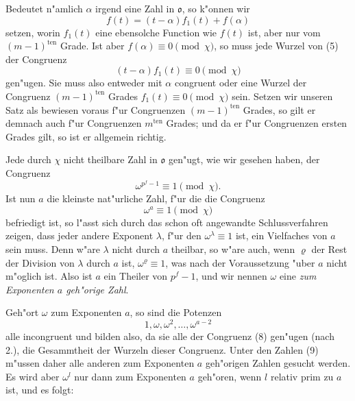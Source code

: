 \documentclass[12pt,a4paper]{article}
\theoremstyle{definition}
\begin{document}
Bedeutet n"amlich $\alpha$ irgend eine Zahl in $\mathfrak{o}$, so k"onnen wir
\begin{equation}
f(t) = (t - \alpha)f_1(t) + f(\alpha)
\end{equation}
setzen, worin $f_1(t)$ eine ebensolche Function wie $f(t)$ ist, aber nur vom $(m-1)^{\text{ten}}$ Grade. Ist aber $f(\alpha) \equiv 0 \pmod{\chi}$, so muss jede Wurzel von (5) der Congruenz
\begin{equation}
(t - \alpha)f_1(t) \equiv 0 \pmod{\chi}
\end{equation}
gen"ugen. Sie muss also entweder mit $\alpha$ congruent oder eine Wurzel der Congruenz $(m-1)^{\text{ten}}$ Grades $f_1(t) \equiv 0 \pmod{\chi}$ sein. Setzen wir unseren Satz als bewiesen voraus f"ur Congruenzen $(m-1)^{\text{ten}}$ Grades, so gilt er demnach auch f"ur Congruenzen $m^{\text{ten}}$ Grades; und da er f"ur Congruenzen ersten Grades gilt, so ist er allgemein richtig.

Jede durch $\chi$ nicht theilbare Zahl in $\mathfrak{o}$ gen"ugt, wie wir gesehen haben, der Congruenz
\begin{equation}
\omega^{p^f-1} \equiv 1 \pmod{\chi}.
\end{equation}
Ist nun $a$ die kleinste nat"urliche Zahl, f"ur die die Congruenz
\begin{equation}
\omega^a \equiv 1 \pmod{\chi}
\end{equation}
befriedigt ist, so l"asst sich durch das schon oft angewandte Schlussverfahren zeigen, dass jeder andere Exponent $\lambda$, f"ur den $\omega^\lambda \equiv 1$ ist, ein Vielfaches von $a$ sein muss. Denn w"are $\lambda$ nicht durch $a$ theilbar, so w"are auch, wenn $\varrho$ der Rest der Division von $\lambda$ durch $a$ ist, $\omega^\varrho \equiv 1$, was nach der Voraussetzung "uber $a$ nicht m"oglich ist. Also ist $a$ ein Theiler von $p^f - 1$, und wir nennen $\omega$ eine \emph{zum Exponenten $a$ geh"orige Zahl}.

Geh"ort $\omega$ zum Exponenten $a$, so sind die Potenzen
\begin{equation}
1, \omega, \omega^2, \dots, \omega^{a-2}
\end{equation}
alle incongruent und bilden also, da sie alle der Congruenz (8) gen"ugen (nach 2.), die Gesammtheit der Wurzeln dieser Congruenz. Unter den Zahlen (9) m"ussen daher alle anderen zum Exponenten $a$ geh"origen Zahlen gesucht werden. Es wird aber $\omega^l$ nur dann zum Exponenten $a$ geh"oren, wenn $l$ relativ prim zu $a$ ist, und es folgt:
\end{document}
